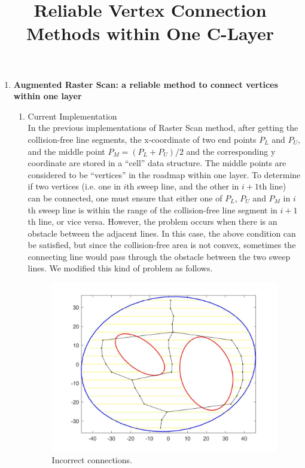 \documentclass{article}
\begin{document}
\title{Reliable Vertex Connection Methods within One C-Layer}
\maketitle

\begin{enumerate}
\item {\bf Augmented Raster Scan: a reliable method to connect vertices within one layer}\\
\begin{enumerate}
\item Current Implementation\\
In the previous implementations of Raster Scan method, after getting the collision-free line segments, the x-coordinate of two end points $P_L$ and $P_U$, and the middle point $P_M = (P_L + P_U) / 2$ and the corresponding y coordinate are stored in a ``cell'' data structure. The middle points are considered to be ``vertices'' in the roadmap within one layer. To determine if two vertices (i.e. one in $i$th sweep line, and the other in $i+1$th line) can be connected, one must ensure that either one of $P_L$, $P_U$ and $P_M$ in $i$th sweep line is within the range of the collision-free line segment in $i+1$th line, or vice versa. However, the problem occurs when there is an obstacle between the adjacent lines. In this case, the above condition can be satisfied, but since the collision-free area is not convex, sometimes the connecting line would pass through the obstacle between the two sweep lines. We modified this kind of problem as follows.

\begin{figure}
\centering
\label{fig:path_incorrect}
\includegraphics[scale = 0.2]{IncorrectConnection_OneLayer.jpg}
\caption{Incorrect connections.}
\end{figure}


\end{enumerate}
\end{enumerate}
\end{document}
